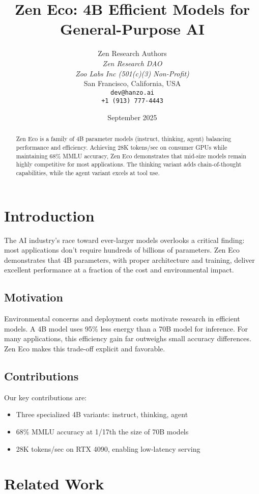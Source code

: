 \documentclass[11pt,a4paper]{article}
\title{Zen Eco: 4B Efficient Models for General-Purpose AI}
\author{
    Zen Research Authors \\
    \textit{Zen Research DAO} \\
    \textit{Zoo Labs Inc (501(c)(3) Non-Profit)} \\
    San Francisco, California, USA \\
    \texttt{dev@hanzo.ai} \\
    \texttt{+1 (913) 777-4443}
}
\date{September 2025}
\begin{document}
\maketitle

\begin{abstract}
Zen Eco is a family of 4B parameter models (instruct, thinking, agent) balancing performance and efficiency. Achieving 28K tokens/sec on consumer GPUs while maintaining 68\% MMLU accuracy, Zen Eco demonstrates that mid-size models remain highly competitive for most applications. The thinking variant adds chain-of-thought capabilities, while the agent variant excels at tool use.
\end{abstract}

\section{Introduction}

The AI industry's race toward ever-larger models overlooks a critical finding: most applications don't require hundreds of billions of parameters. Zen Eco demonstrates that 4B parameters, with proper architecture and training, deliver excellent performance at a fraction of the cost and environmental impact.

\subsection{Motivation}
Environmental concerns and deployment costs motivate research in efficient models. A 4B model uses 95\% less energy than a 70B model for inference. For many applications, this efficiency gain far outweighs small accuracy differences. Zen Eco makes this trade-off explicit and favorable.

\subsection{Contributions}
Our key contributions are:
\begin{itemize}
    \item Three specialized 4B variants: instruct, thinking, agent
    \item 68\% MMLU accuracy at 1/17th the size of 70B models
    \item 28K tokens/sec on RTX 4090, enabling low-latency serving
\end{itemize}

\section{Related Work}
\end{document}
